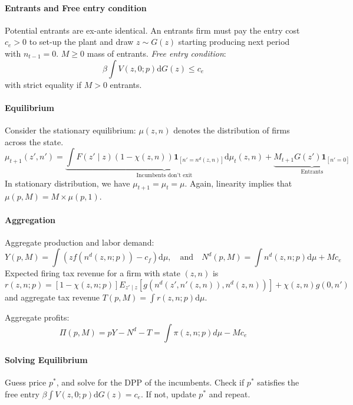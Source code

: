 \documentclass[11pt,a4paper]{article}
\begin{document}
\paragraph{Entrants and Free entry condition}
Potential entrants are ex-ante identical. An entrants firm must pay the entry cost $c_e>0$ to set-up the plant and draw $z\sim G(z)$ starting producing next period with $n_{t-1}=0$. $M\geq 0$ mass of entrants. 
\textit{Free entry condition}: $$\beta \int V(z,0;p)\mathrm{d}G(z)\leq c_e$$ with strict equality if $M>0$ entrants.

\paragraph{Equilibrium}
Consider the stationary equilibrium: $\mu(z,n)$ denotes the distribution of firms across the state. 
\begin{equation} \mu_{t+1}(z',n') =\underbrace{ \int F(z'\mid z)(1-\chi(z,n))\mathbf{1}_{[n'=n^d(z,n)]} \mathrm{d}\mu_t (z,n)}_{\text{Incumbents don't exit}} + \underbrace{M_{t+1}G(z')\mathbf{1}_{[n'=0]}}_{\text{Entrants}} \end{equation}
In stationary distribution, we have $\mu_{t+1}= \mu_t = \mu$. Again, linearity implies that $\mu(p,M) = M\times \mu(p,1)$. 


\paragraph{Aggregation}
Aggregate production and labor demand: 
$$ Y(p,M) = \int (z f(n^d(z,n;p))-c_f)\mathrm{d}\mu,\quad \text{and}\quad N^d(p,M) = \int n^d(z,n;p)\mathrm{d}\mu + M c_e $$
Expected firing tax revenue for a firm with state $(z,n)$ is 
\begin{equation}
  r(z,n;p ) = [1-\chi(z,n;p)]E_{z'\mid z}[g(n^d(z',n'(z,n)),n^d(z,n))]+\chi(z,n)g(0,n')
\end{equation}
and aggregate tax revenue $T(p,M) = \int r(z,n;p)\mathrm{d}\mu$. 

Aggregate profits: \begin{equation}
  \Pi (p,M) = p Y - N^d - T = \int \pi (z,n;p)d\mu- M c_e
\end{equation}



\paragraph{Solving Equilibrium}
Guess price $p^*$, and solve for the DPP of the incumbents. Check if $p^*$ satisfies the free entry $\beta \int V(z,0;p)\mathrm{d}G(z)= c_e$. If not, update $p^*$ and repeat. 
\end{document}
